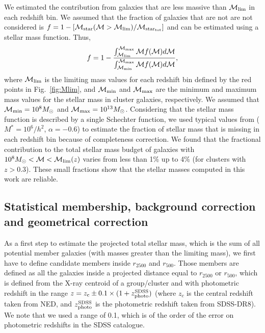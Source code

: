 \documentclass{aa}
\begin{document}
We estimated the contribution from galaxies that are less massive than $\mathcal{M}_{\rm lim}$ in each redshift bin.
We assumed that the fraction of galaxies that are not are not considered is
$f  = 1 - [\mathcal{M_{\rm star}} (\mathcal{M} > \mathcal{M}_{\rm lim})/\mathcal{M}_{\rm star_{\rm tot}}]$ and can be 
estimated using a stellar mass function. 
Thus,
\begin{equation}
f = 1 - \frac{\int_{\mathcal{M}_{\rm lim}}^{\mathcal{M}_{\rm max}} \mathcal{M} f(\mathcal{M}) d\mathcal{M}}{\int_{\mathcal{M}_{\rm min}}^{\mathcal{M}_{\rm max}} \mathcal{M} f(\mathcal{M}) d\mathcal{M}},
\end{equation}
where $\mathcal{M}_{\rm lim}$ is the limiting mass values for each redshift bin defined by the red points in Fig.~\ref{fig:Mlim},
and $\mathcal{M}_{\rm min}$ and $\mathcal{M}_{\rm max}$ are the minimum and maximum mass values for  the stellar mass in cluster galaxies, respectively.  
We assumed that  $\mathcal{M}_{\rm min} = 10^{8} M_{\odot}$ and $\mathcal{M}_{\rm max} = 10^{13} M_{\odot}$.
Considering that the stellar mass function is described by a single Schechter function, we used typical values from 
\citet{bell03} ($M^{\ast} = 10^{6}/h^{2}$, $\alpha = -0.6$) to estimate the fraction of stellar mass that is missing in each redshift bin because of
completeness correction. We found that the fractional contribution to the total stellar mass budget of galaxies with 
$10^{8} M_{\odot} < \mathcal{M} < \mathcal{M}_{\rm lim} (z)$ varies from less than 1\% up to 4\% (for clusters with $z > 0.3$). 
These small fractions \citep[also in agreement with][]{lms03,giodini09} show that the stellar masses computed in this work are 
reliable.



\subsection{Statistical membership,  background correction and geometrical correction}

As a first step to estimate the projected total stellar mass,
  which is the sum of all potential member galaxies (with masses
  greater than the limiting mass), we first have to define candidate
  members inside $r_{2500}$ and $r_{500}$.  Those members are defined
  as all the galaxies inside a projected distance equal to $r_{2500}$
  or $r_{500}$, which is defined from the X-ray centroid of a group/cluster and with
  photometric redshift in the range $z=z_{\rm c} \pm 0.1 \times (1+
  z_{\rm photo}^{\rm SDSS})$ (where $z_{c}$ is the central redshift taken from NED, and
 $z_{\rm photo}^{\rm SDSS}$ is the photometric redshift taken from SDSS-DR8).  We note
  that we used a range of 0.1, which is of the order of the error on
  photometric redshifts in the SDSS catalogue.
\end{document}
